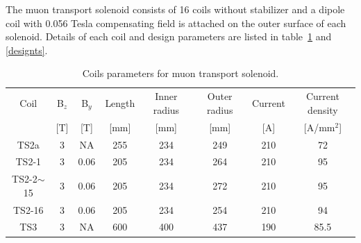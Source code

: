 The muon transport solenoid consists of 16 coils without stabilizer and a dipole coil with 0.056 Tesla compensating field is attached on the outer surface of each solenoid.
Details of each coil and design parameters are listed in table~\ref{tscoil} and \ref{designts}.
\begin{table}[H]
 \centering
 \begin{tabular}{cccccccc} \hline \hline
  Coil & B$_z$ & B$_y$ & Length & Inner radius & Outer radius & Current & Current density \\
   & [T] & [T] & [mm] & [mm] & [mm] & [A] & [A/mm$^2$] \\ \hline
  TS2a & 3 & NA & 255 & 234 & 249 & 210 & 72 \\
  TS2-1 & 3 & 0.06 & 205 & 234 & 264 & 210 & 95 \\
  TS2-2$\sim$15 & 3 & 0.06 & 205 & 234 & 272 & 210 & 95 \\
  TS2-16 & 3 & 0.06 & 205 & 234 & 254 & 210 & 94 \\
  TS3 & 3 & NA & 600 & 400 & 437 & 190 & 85.5 \\ \hline \hline
 \end{tabular}
 \caption{Coils parameters for muon transport solenoid.}
 \label{tscoil}
\end{table}
